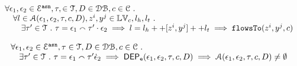 %
\begin{thm}
\label{thm:alg_correct}
\[
\begin{array}{l}
  \forall \mathtt{\epsilon}_1, \mathtt{\epsilon}_2 \in \mathcal{E}^{\mathtt{{asn}}}, \mathtt{\tau}, \in \mathcal{T}, D \in \mathcal{DB} , c \in \mathcal{C} ~.~
  \\ \quad 
   \forall l \in \mathcal{A}(\mathtt{\epsilon}_1, \mathtt{\epsilon}_2, \mathtt{\tau}, c, D), z^i, y^j \in \mathbb{LV}_c, l_h, l_t ~.~ 
  \\ \qquad 
   \exists \mathtt{\tau}' \in \mathcal{T} ~.~ \mathtt{\tau} = \mathtt{\epsilon}_1 \smallfrown \mathtt{\tau}' \cdot \mathtt{\epsilon}_2
   \implies 
   l = l_h ++ [z^i, y^j] ++ l_t 
   \implies \mathtt{flowsTo}(z^i, y^j, c)
\end{array}
\]
\end{thm}
%
%
\begin{thm}
\label{thm:algeventdep_sound}
\[
\begin{array}{l}
  \forall \mathtt{\epsilon}_1, \mathtt{\epsilon}_2 \in \mathcal{E}^{\mathtt{{asn}}}, \mathtt{\tau} \in \mathcal{T}, D \in \mathcal{DB} , c \in \mathcal{C} ~.~
  \\ \quad 
  \exists \mathtt{\tau}' \in \mathcal{T} ~.~ \mathtt{\tau} = \mathtt{\epsilon}_1 \smallfrown \mathtt{\tau}' \dot {\mathtt{\epsilon}}_2
  \implies \mathsf{DEP_{\mathtt{e}}}(\mathtt{\epsilon}_1, \mathtt{\epsilon}_2,\mathtt{\tau}, {c}, D)
   \implies
   \mathcal{A}(\mathtt{\epsilon}_1, \mathtt{\epsilon}_2, \mathtt{\tau}, c, D) \neq \emptyset
\end{array}
\]
\end{thm}
%
